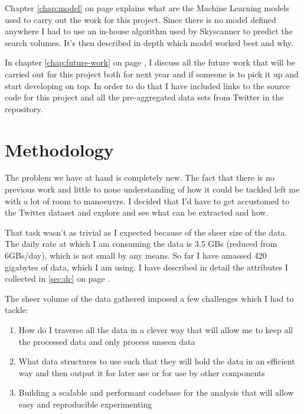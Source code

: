\documentclass[minf,frontabs,twoside,singlespacing,parskip]{infthesis}
\begin{document}
Chapter \ref{chap:model} on page \pageref{chap:model} explains what are the Machine Learning models used to carry out the work for this project. Since there is no model defined anywhere I had to use an in-house algorithm used by Skyscanner to predict the search volumes. It's then described in depth which model worked best and why. 


In chapter \ref{chap:future-work} on page \pageref{chap:future-work}, I discuss all the future work that will be carried out for this project both for next year and if someone is to pick it up and start developing on top. In order to do that I have included links to the source code for this project and all the pre-aggregated data sets from Twitter in the repository.




















\chapter{Methodology}
\label{chap:method}

The problem we have at hand is completely new. The fact that there is no previous work and little to none understanding of how it could be tackled left me with a lot of room to manoeuvre. I decided that I'd have to get accustomed to the Twitter dataset and explore and see what can be extracted and how. 


That task wasn't as trivial as I expected because of the sheer size of the data. The daily rate at which I am consuming the data is 3.5 GBs (reduced from 6GBs/day), which is not small by any means. So far I have amassed 420 gigabytes of data, which I am using. I have described in detail the attributes I collected in \ref{sec:dc} on page \pageref{sec:dc}. 


The sheer volume of the data gathered imposed a few challenges which I had to tackle:
\begin{enumerate}
\item How do I traverse all the data in a clever way that will allow me to keep all the processed data and only process unseen data
\item What data structures to use such that they will hold the data in an efficient way and then output it for later use or for use by other components
\item Building a scalable and performant codebase for the analysis that will allow easy and reproducible experimenting
\end{enumerate}
\end{document}
